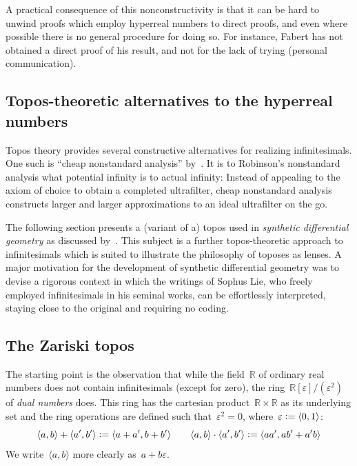 \documentclass[graybox]{svmult}
\newcommand{\RR}{\mathbb{R}}
\newcommand{\defeq}{\vcentcolon=}
\renewcommand{\_}{\mathpunct{.}\,}
\newcommand{\?}{\,{:}\,}
\begin{document}
A practical consequence of this nonconstructivity is that it can be hard to
unwind proofs which employ hyperreal numbers to direct proofs, and even where
possible there is no general procedure for doing so. For instance, Fabert has
not obtained a direct proof of his result, and not for the lack of trying
(personal communication).


\subsection{Topos-theoretic alternatives to the hyperreal numbers} Topos theory
provides several constructive alternatives for realizing infinitesimals.
One such is ``cheap nonstandard analysis'' by~\cite{tao:cheap-nsa}.
It is to Robinson's nonstandard analysis what potential infinity is
to actual infinity: Instead of appealing to the axiom of choice to
obtain a completed ultrafilter, cheap nonstandard analysis constructs larger
and larger approximations to an ideal ultrafilter on the go.

The following section presents a (variant of a) topos used in \emph{synthetic differential
geometry} as discussed by~\cite{kock:sdg,kock:new-methods}. This subject is a further topos-theoretic
approach to infinitesimals which is suited to illustrate the philosophy of toposes
as lenses. A major motivation for the development of synthetic differential
geometry was to devise a rigorous context in which the
writings of Sophus Lie, who freely employed infinitesimals in his seminal
works, can be effortlessly interpreted, staying close to the
original and requiring no coding.


\subsection{The Zariski topos}
\label{sect:the-zariski-topos}
The starting point is the observation that
while the field~$\RR$ of ordinary real numbers does not contain infinitesimals
(except for zero), the ring~$\RR[\varepsilon]/(\varepsilon^2)$ of \emph{dual
numbers} does. This ring has the cartesian product~$\RR \times \RR$ as its
underlying set and the ring operations are defined such
that~$\varepsilon^2 = 0$, where~$\varepsilon \defeq \langle 0,1 \rangle$:
\[
  \langle a,b \rangle + \langle a',b' \rangle \defeq
  \langle a+a', b+b' \rangle \qquad
  \langle a,b \rangle \cdot \langle a',b' \rangle \defeq
  \langle aa', ab'+a'b \rangle
\]
We write~$\langle a,b \rangle$ more clearly
as~$a+b\varepsilon$.
\end{document}
